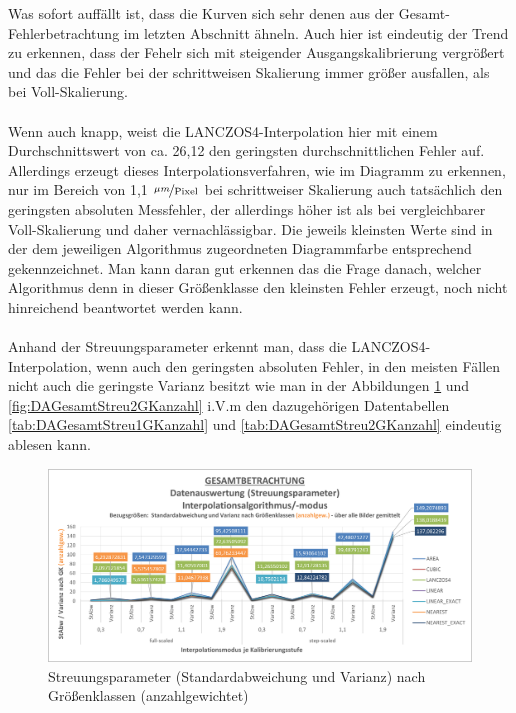 \documentclass[
fontsize=10pt, 
listof = totoc,
parskip = half	
]{report}
\begin{document}
\noindent Was sofort auffällt ist, dass die Kurven sich sehr denen aus der Gesamt-Fehlerbetrachtung im letzten Abschnitt ähneln. Auch hier ist eindeutig der Trend zu erkennen, dass der Fehelr sich mit steigender Ausgangskalibrierung vergrößert und das die Fehler bei der schrittweisen Skalierung immer größer ausfallen, als bei Voll-Skalierung. 
\\\\
Wenn auch knapp, weist die LANCZOS4-Interpolation hier mit einem Durchschnittswert von ca. 26,12 den geringsten durchschnittlichen Fehler auf. Allerdings erzeugt dieses Interpolationsverfahren, wie im Diagramm zu erkennen, nur im Bereich von 1,1 $\nicefrac{\mu m}{\text{Pixel}}$ bei schrittweiser Skalierung auch tatsächlich den geringsten absoluten Messfehler, der allerdings höher ist als bei vergleichbarer Voll-Skalierung und daher vernachlässigbar. Die jeweils kleinsten Werte sind in der dem jeweiligen Algorithmus zugeordneten Diagrammfarbe entsprechend gekennzeichnet. Man kann daran gut erkennen das die Frage danach, welcher Algorithmus denn in dieser Größenklasse den kleinsten Fehler erzeugt, noch nicht hinreichend beantwortet werden kann.
\\\\
Anhand der Streuungsparameter erkennt man, dass die LANCZOS4-Interpolation, wenn auch den geringsten absoluten Fehler, in den meisten Fällen nicht auch die geringste Varianz besitzt wie man in der Abbildungen \ref{fig:DAGesamtStreu1GKanzahl} und \ref{fig:DAGesamtStreu2GKanzahl} i.V.m  den dazugehörigen Datentabellen \ref{tab:DAGesamtStreu1GKanzahl} und \ref{tab:DAGesamtStreu2GKanzahl} eindeutig ablesen kann.

\begin{figure}[H]
	\centering
	\includegraphics[width=\textwidth, height=\textheight, keepaspectratio]{pics/DA_Gesamt_Streu1_GKanzahl}
	\caption{Streuungsparameter (Standardabweichung und Varianz) nach Größenklassen (anzahlgewichtet)}
	\label{fig:DAGesamtStreu1GKanzahl}
\end{figure}
\end{document}
